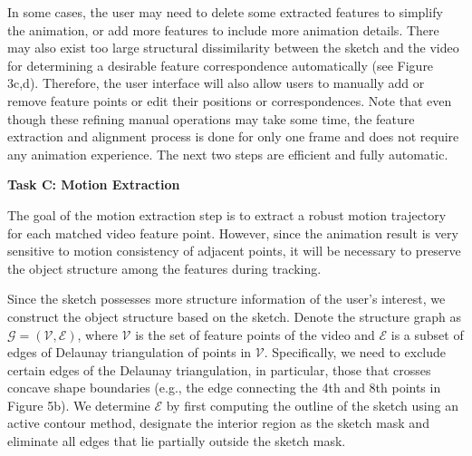 
In some cases, {the user may need to delete some extracted features to simplify the animation}, or add more features to include more animation details. 
There may also exist too large structural dissimilarity between the sketch and the video for determining a desirable feature correspondence automatically (see Figure 3c,d).
Therefore, the user interface will also allow users to manually add or remove feature points or edit their positions or correspondences.
Note that even though these {refining} manual operations may take some time, the feature extraction and alignment process is done for only one frame and does not require any animation experience. The next two steps are efficient and fully automatic. 




\textbf{Task C: Motion Extraction}

The goal of the motion extraction step is to extract a robust motion trajectory for each matched video feature point. However, since {the animation result} is very sensitive to motion consistency of adjacent points, it will be necessary to preserve the object structure {among the features during tracking}.


Since the sketch possesses more structure information of the user's interest, we construct the object structure based 
on the sketch. 
Denote the structure graph as $ \mathcal{G} = (\mathcal{V}, \mathcal{E}) $, where $ \mathcal{V} $ is the set of feature points of the video and 
$ \mathcal{E} $ is a subset of edges of Delaunay triangulation of points in $ \mathcal{V} $. 
Specifically, we need to exclude certain edges of the Delaunay triangulation, in particular, those that crosses concave shape boundaries (e.g., the edge connecting the 4th and 8th points in Figure 5b).
We determine $\mathcal{E}$ by first computing the outline of the sketch using an active contour method, designate the interior region as the sketch mask and eliminate all edges that lie partially outside the sketch mask. 

